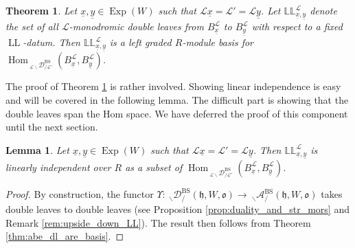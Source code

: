 \documentclass{amsart}
\newcommand{\scrL}{\mathcal{L}}
\DeclareMathOperator{\Hom}{Hom}
\newcommand{\fr}[1]{\mathfrak{#1}}
\DeclareMathOperator{\BS}{BS}
\DeclareMathOperator{\LL}{LL}
\newcommand{\dLL}{\mathbb{L}\mathbb{L}}
\newcommand{\EWmon}[2]{\:_{#1 \backslash} \mathcal{D}_{/ #2} }
\newcommand{\Amon}[2]{\:_{#1 \backslash} \mathcal{A}_{/ #2} }
\DeclareMathOperator{\Exp}{Exp}
\newcommand{\ux}{\underline{x}}
\newcommand{\uy}{\underline{y}}
\newtheorem{lemma}[subsubsection]{Lemma}
\newtheorem{theorem}[subsubsection]{Theorem}
\theoremstyle{definition}
\numberwithin{equation}{subsection}
\begin{document}
\begin{theorem}\label{thm:dll_is_a_basis}
    Let $\ux, \uy \in \Exp (W)$ such that $\scrL \ux = \scrL' = \scrL \uy$.
    Let $\dLL_{\ux, \uy}^{\scrL}$ denote the set of all $\scrL$-monodromic double leaves from $B_{\ux}^{\scrL}$ to $B_{\uy}^{\scrL}$ with respect to a fixed $\LL$-datum.
    Then $\dLL_{\ux, \uy}^{\scrL}$ is a left graded $R$-module basis for $\Hom_{\EWmon{\scrL}{\scrL'}^{\BS}} (B_{\ux}^{\scrL}, B_{\uy}^{\scrL})$.
\end{theorem}

The proof of Theorem \ref{thm:dll_is_a_basis} is rather involved. Showing linear independence is easy and will be covered in the following lemma. The difficult part is showing that the double leaves span the Hom space.
We have deferred the proof of this component until the next section.

\begin{lemma}\label{lem:dl_are_lin_indep_for_EW}
    Let $\ux, \uy \in \Exp (W)$ such that $\scrL \ux = \scrL' = \scrL \uy$.
    Then $\dLL_{\ux, \uy}^{\scrL}$ is linearly independent over $R$ as a subset of $\Hom_{\EWmon{\scrL}{\scrL'}^{\BS}} (B_{\ux}^{\scrL}, B_{\uy}^{\scrL})$.
\end{lemma}
\begin{proof}
    By construction, the functor $\Upsilon : \EWmon{}{}^{\BS} (\fr{h}, W, \fr{o}) \to \Amon{}{}^{\BS} (\fr{h}, W, \fr{o})$ takes double leaves to double leaves (see Proposition \ref{prop:duality_and_str_mors} and Remark \ref{rem:upside_down_LL}).
    The result then follows from Theorem \ref{thm:abe_dl_are_basis}.
\end{proof}
\end{document}
